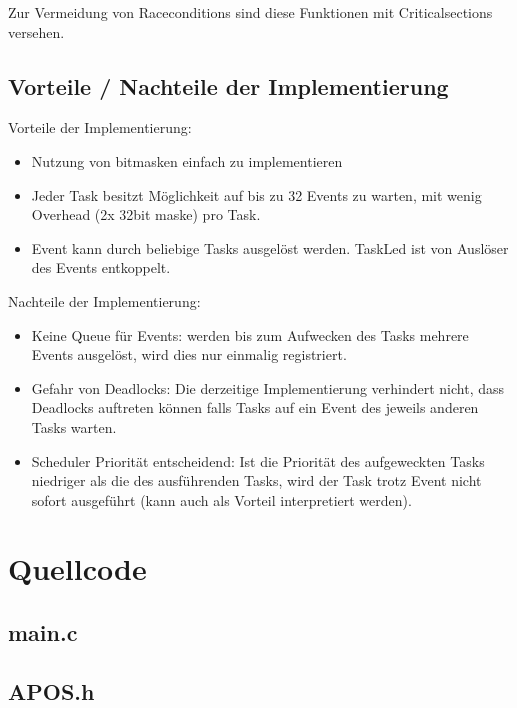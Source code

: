 \documentclass[12pt,naustrian,a4widepaper]{scrartcl}
\begin{document}
Zur Vermeidung von Raceconditions sind diese Funktionen mit Criticalsections versehen.  

\subsection{Vorteile / Nachteile der Implementierung}

Vorteile der Implementierung:
\begin{itemize}
	\item Nutzung von bitmasken einfach zu implementieren
	\item Jeder Task besitzt Möglichkeit auf bis zu 32 Events zu warten, mit wenig Overhead (2x 32bit maske) pro Task.
	\item Event kann durch beliebige Tasks ausgelöst werden. TaskLed ist von Auslöser des Events entkoppelt.
\end{itemize}

Nachteile der Implementierung:
\begin{itemize}
	\item Keine Queue für Events: werden bis zum Aufwecken des Tasks mehrere Events ausgelöst, wird dies nur einmalig registriert.
	\item Gefahr von Deadlocks: Die derzeitige Implementierung verhindert nicht, dass Deadlocks auftreten können falls Tasks auf ein Event des jeweils anderen Tasks warten.
	\item Scheduler Priorität entscheidend: Ist die Priorität des aufgeweckten Tasks niedriger als die des ausführenden Tasks, wird der Task trotz Event nicht sofort ausgeführt (kann auch als Vorteil interpretiert werden).
\end{itemize}

\clearpage
\section{Quellcode}
 \subsection{main.c}
 
 \subsection{APOS.h}
 
\end{document}
